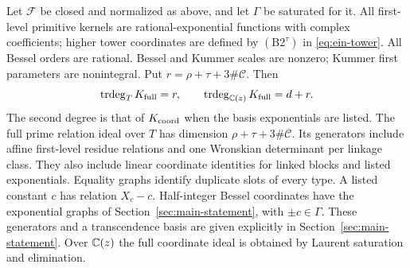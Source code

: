 \begin{theorem}\label{thm:main}
Let $\mathcal F$ be closed and normalized as above, and let $\Gamma$
be saturated for it. All first-level primitive kernels are rational-exponential
functions with complex coefficients; higher tower coordinates are defined by
$(\mathrm{B2}^\tau)$ in \eqref{eq:ein-tower}. All Bessel orders are rational.
Bessel and Kummer scales are nonzero; Kummer first parameters are nonintegral.
Put $r=\rho+\tau+3\#\mathcal C$. Then
\begin{equation}\label{eq:main-degree}
\operatorname{trdeg}_TK_{\rm full}=r,\qquad\operatorname{trdeg}_{\mathbb{C}(z)}K_{\rm full}=d+r.
\end{equation}
The second degree is that of $K_{\rm coord}$ when the basis exponentials
are listed. The full prime relation ideal over $T$ has dimension
$\rho+\tau+3\#\mathcal C$. Its generators include affine
first-level residue relations and one Wronskian determinant per linkage class.
They also include linear coordinate identities for linked blocks and listed exponentials.
Equality graphs identify duplicate slots of every type.
A listed constant $c$ has relation $X_c-c$.
Half-integer Bessel coordinates have the exponential graphs of
Section~\ref{sec:main-statement}, with $\pm c\in\Gamma$.
These generators and a transcendence basis are given
explicitly in Section~\ref{sec:main-statement}. Over $\mathbb{C}(z)$ the full
coordinate ideal is obtained by Laurent saturation and elimination.
\end{theorem}

